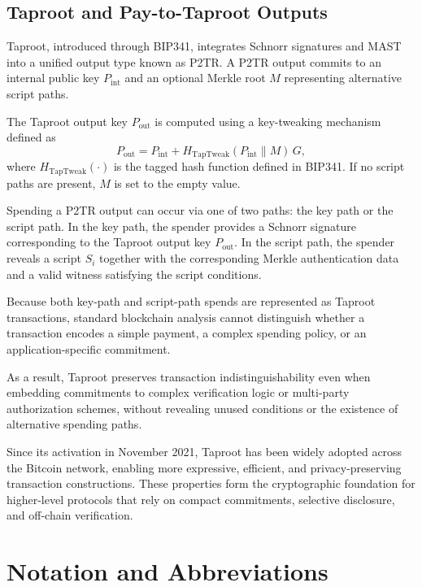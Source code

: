 \documentclass{IEEEoj}
\begin{document}
\subsection{Taproot and Pay-to-Taproot Outputs}

Taproot, introduced through BIP341, integrates Schnorr signatures and MAST into a unified output type known as P2TR.
A P2TR output commits to an internal public key $P_{\text{int}}$ and an optional Merkle root $M$ representing alternative script paths.

The Taproot output key $P_{\text{out}}$ is computed using a key-tweaking mechanism defined as
\[
P_{\text{out}} = P_{\text{int}} + H_{\text{TapTweak}}(P_{\text{int}} \parallel M)\,G,
\]
where $H_{\text{TapTweak}}(\cdot)$ is the tagged hash function defined in BIP341.
If no script paths are present, $M$ is set to the empty value.

Spending a P2TR output can occur via one of two paths: the key path or the script path.
In the key path, the spender provides a Schnorr signature corresponding to the Taproot output key $P_{\text{out}}$.
In the script path, the spender reveals a script $S_i$ together with the corresponding Merkle authentication data and a valid witness satisfying the script conditions.

Because both key-path and script-path spends are represented as Taproot transactions, standard blockchain analysis cannot distinguish whether a transaction encodes a simple payment, a complex spending policy, or an application-specific commitment.

As a result, Taproot preserves transaction indistinguishability even when embedding commitments to complex verification logic or multi-party authorization schemes, without revealing unused conditions or the existence of alternative spending paths.

Since its activation in November 2021, Taproot has been widely adopted across the Bitcoin network, enabling more expressive, efficient, and privacy-preserving transaction constructions.
These properties form the cryptographic foundation for higher-level protocols that rely on compact commitments, selective disclosure, and off-chain verification.


\section{Notation and Abbreviations}
\label{sec:notation}
\end{document}
